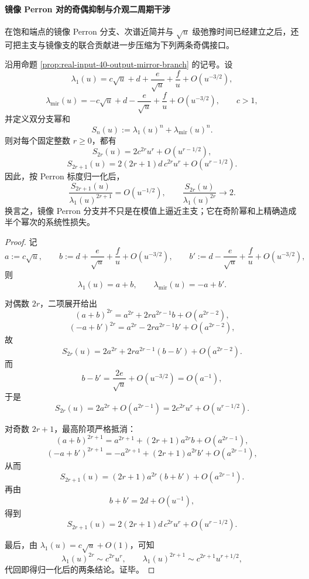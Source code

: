 \paragraph{镜像 Perron 对的奇偶抑制与介观二周期干涉}
在饱和端点的镜像 Perron 分支、次谱近简并与 \(\sqrt u\) 级弛豫时间已经建立之后，还可把主支与镜像支的联合贡献进一步压缩为下列两条奇偶接口。

\begin{theorem}\label{thm:xi-time-part50cb-mirror-branch-evenodd-power-sum-suppression}
沿用命题 \ref{prop:real-input-40-output-mirror-branch} 的记号。设
\[
\lambda_1(u)=c\sqrt u+d+\frac{e}{\sqrt u}+\frac{f}{u}+O(u^{-3/2}),
\]
\[
\lambda_{\mathrm{mir}}(u)=-c\sqrt u+d-\frac{e}{\sqrt u}+\frac{f}{u}+O(u^{-3/2}),
\qquad
c>1,
\]
并定义双分支幂和
\[
S_n(u):=\lambda_1(u)^n+\lambda_{\mathrm{mir}}(u)^n.
\]
则对每个固定整数 \(r\ge 0\)，都有
\[
\boxed{\;
S_{2r}(u)=2c^{2r}u^r+O(u^{r-1/2}),\;}
\]
\[
\boxed{\;
S_{2r+1}(u)=2(2r+1)d\,c^{2r}u^r+O(u^{r-1/2}).\;}
\]
因此，按 Perron 标度归一化后，
\[
\boxed{\;
\frac{S_{2r+1}(u)}{\lambda_1(u)^{2r+1}}=O(u^{-1/2}),
\qquad
\frac{S_{2r}(u)}{\lambda_1(u)^{2r}}\longrightarrow 2.\;}
\]
换言之，镜像 Perron 分支并不只是在模值上逼近主支；它在奇阶幂和上精确造成半个幂次的系统性损失。
\end{theorem}
\begin{proof}
记
\[
a:=c\sqrt u,
\qquad
b:=d+\frac{e}{\sqrt u}+\frac{f}{u}+O(u^{-3/2}),
\qquad
b':=d-\frac{e}{\sqrt u}+\frac{f}{u}+O(u^{-3/2}),
\]
则
\[
\lambda_1(u)=a+b,
\qquad
\lambda_{\mathrm{mir}}(u)=-a+b'.
\]

对偶数 \(2r\)，二项展开给出
\[
(a+b)^{2r}=a^{2r}+2r a^{2r-1}b+O(a^{2r-2}),
\]
\[
(-a+b')^{2r}=a^{2r}-2r a^{2r-1}b'+O(a^{2r-2}),
\]
故
\[
S_{2r}(u)=2a^{2r}+2r a^{2r-1}(b-b')+O(a^{2r-2}).
\]
而
\[
b-b'=\frac{2e}{\sqrt u}+O(u^{-3/2})=O(a^{-1}),
\]
于是
\[
S_{2r}(u)=2a^{2r}+O(a^{2r-1})=2c^{2r}u^r+O(u^{r-1/2}).
\]

对奇数 \(2r+1\)，最高阶项严格抵消：
\[
(a+b)^{2r+1}=a^{2r+1}+(2r+1)a^{2r}b+O(a^{2r-1}),
\]
\[
(-a+b')^{2r+1}=-a^{2r+1}+(2r+1)a^{2r}b'+O(a^{2r-1}),
\]
从而
\[
S_{2r+1}(u)=(2r+1)a^{2r}(b+b')+O(a^{2r-1}).
\]
再由
\[
b+b'=2d+O(u^{-1}),
\]
得到
\[
S_{2r+1}(u)=2(2r+1)d\,c^{2r}u^r+O(u^{r-1/2}).
\]

最后，由 \(\lambda_1(u)=c\sqrt u+O(1)\)，可知
\[
\lambda_1(u)^{2r}\sim c^{2r}u^r,
\qquad
\lambda_1(u)^{2r+1}\sim c^{2r+1}u^{r+1/2},
\]
代回即得归一化后的两条结论。证毕。
\end{proof}

